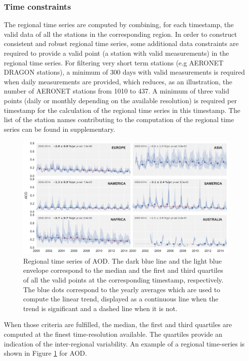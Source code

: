 \documentclass[journal abbreviation, manuscript]{copernicus}
\begin{document}
\subsubsection{Time constraints}
The regional time series are computed by combining, for each timestamp, the valid data of all the stations in the corresponding region. In order to construct consistent and robust regional time series, some additional data constraints are required to provide a valid point (a station with valid measurements) in the regional time series. For filtering very short term stations (e.g AERONET DRAGON stations), a minimum of 300 days with valid measurements is required when daily measurements are provided, which reduces, as an illustration, the number of AERONET stations from 1010 to 437. A minimum of three valid points (daily or monthly depending on the available resolution) is required per timestamp for the calculation of the regional time series in this timestamp. The list of the station names contributing to the computation of the regional time series can be found in supplementary.

\begin{figure}
 \includegraphics[width=16cm]{../scripts/figs/ts/panel-od550aer.png}
 \caption{Regional time series of AOD. The dark blue line and the light blue envelope correspond to the median and the first and third quartiles of all the valid points at the corresponding timestamp, respectively. The blue dots correspond to the yearly averages which are used to compute the linear trend, displayed as a continuous line when the trend is significant and a dashed line when it is not.}
 \label{fig:ts_aod}
\end{figure}

When those criteria are fulfilled, the median, the first and third quartiles are computed at the finest time-resolution available. The quartiles provide an indication of the inter-regional variability. An example of a regional time-series is shown in Figure \ref{fig:ts_aod} for AOD.
\end{document}
